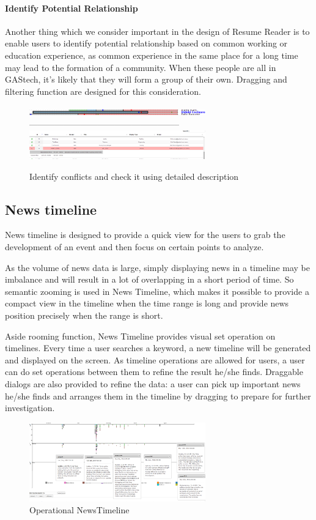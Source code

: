 \documentclass{vgtc}                          %
\begin{document}
\paragraph{Identify Potential Relationship}
Another thing which we consider important in the design of Resume Reader is to enable users to identify potential relationship based on common working or education experience, as common experience in the same place for a long time may lead to the formation of a community. When these people are all in GAStech, it's likely that they will form a group of their own. Dragging and filtering function are designed for this consideration.

\begin{figure}[htb!]
  \centering
  \includegraphics[width=3in]{SingleExperienceLine1.png}
  -----------------------------------------------------
  \includegraphics[width=3in]{SingleExperienceLine2.png}
  \caption{Identify conflicts and check it using detailed description}
\end{figure}

\subsection{News timeline}
News timeline is designed to provide a quick view for the users to grab the development of an event and then focus on certain points to analyze. 
\par
As the volume of news data is large, simply displaying news in a timeline may be imbalance and will result in a lot of overlapping in a short period of time. So semantic zooming is used in News Timeline, which makes it possible to provide a compact view in the timeline when the time range is long and provide news position precisely when the range is short.
\par
Aside rooming function, News Timeline provides visual set operation on timelines. Every time a user searches a keyword, a new timeline will be generated and displayed on the screen. As timeline operations are allowed for users, a user can do set operations between them to refine the result he/she finds. Draggable dialogs are also provided to refine the data: a user can pick up important news he/she finds and arranges them in the timeline by dragging to prepare for further investigation.
\begin{figure}[htb!]
  \centering
  \includegraphics[width=3in]{image017.png}
  \caption{Operational NewsTimeline}
\end{figure}
\end{document}
